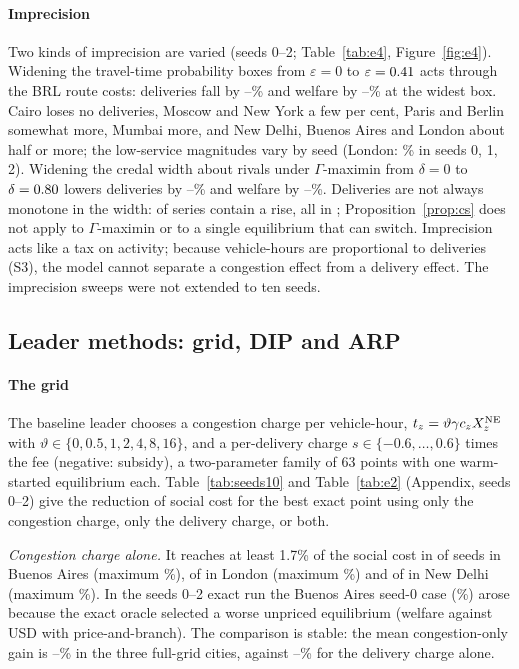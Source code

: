 \documentclass[preprint,12pt]{elsarticle}
\theoremstyle{definition}
\theoremstyle{remark}
\begin{document}
\paragraph{Imprecision} Two kinds of imprecision are varied (seeds 0--2; Table~\ref{tab:e4}, Figure~\ref{fig:e4}). Widening the travel-time probability boxes from $\varepsilon=0$ to $\varepsilon=0.41$ acts through the BRL route costs: deliveries fall by \EfourPbDelMin--\EfourPbDelMax\% and welfare by \EfourPbWMin--\EfourPbWMax\% at the widest box. Cairo loses no deliveries, Moscow and New York a few per cent, Paris and Berlin somewhat more, Mumbai more, and New Delhi, Buenos Aires and London about half or more; the low-service magnitudes vary by seed (London: \EfourLondonPb\% in seeds 0, 1, 2). Widening the credal width about rivals under $\Gamma$-maximin from $\delta=0$ to $\delta=0.80$ lowers deliveries by \EfourGaDelMin--\EfourGaDelMax\% and welfare by \EfourGaWMin--\EfourGaWMax\%. Deliveries are not always monotone in the width: \EfourNonMonoN{} of \EfourSeries{} series contain a rise, all in \EfourNonMonoCities; Proposition~\ref{prop:cs} does not apply to $\Gamma$-maximin or to a single equilibrium that can switch. Imprecision acts like a tax on activity; because vehicle-hours are proportional to deliveries (S3), the model cannot separate a congestion effect from a delivery effect. The imprecision sweeps were not extended to ten seeds.

\subsection{Leader methods: grid, DIP and ARP}\label{sec:res-leader}

\paragraph{The grid} The baseline leader chooses a congestion charge per vehicle-hour, $t_z=\vartheta\gamma c_zX_z^{\rm NE}$ with $\vartheta\in\{0,0.5,1,2,4,8,16\}$, and a per-delivery charge $s\in\{-0.6,\dots,0.6\}$ times the fee (negative: subsidy), a two-parameter family of 63 points with one warm-started equilibrium each. Table~\ref{tab:seeds10} and Table~\ref{tab:e2} (Appendix, seeds 0--2) give the reduction of social cost for the best exact point using only the congestion charge, only the delivery charge, or both.

\emph{Congestion charge alone.} It reaches at least 1.7\% of the social cost in \TenCongHiBuenosAires{} of \TenNBuenosAires{} seeds in Buenos Aires (maximum \TenCongMaxBuenosAires\%), \TenCongHiLondon{} of \TenNLondon{} in London (maximum \TenCongMaxLondon\%) and \TenCongHiNewDelhi{} of \TenNNewDelhi{} in New Delhi (maximum \TenCongMaxNewDelhi\%). In the seeds 0--2 exact run the Buenos Aires seed-0 case (\EtwoCongMax\%) arose because the exact oracle selected a worse unpriced equilibrium (welfare \ExBAWNew{} against \ExBAWOld{} USD with price-and-branch). The comparison is stable: the mean congestion-only gain is \TenCongMeanMin--\TenCongMeanMax\% in the three full-grid cities, against \TenDelMeanMin--\TenDelMeanMax\% for the delivery charge alone.
\end{document}
